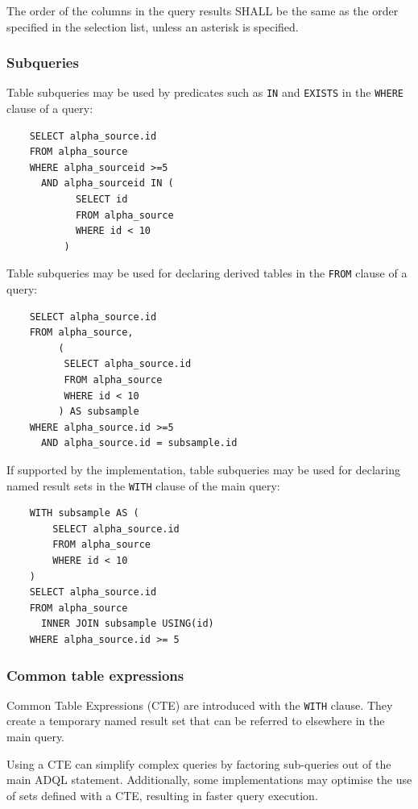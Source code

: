 \documentclass[11pt,a4paper]{ivoa}
\begin{document}
The order of the columns in the query results SHALL be the same as the
order specified in the selection list,
unless an asterisk is specified.

\subsubsection{Subqueries}
\label{sec:subqueries}

Table subqueries may be used by predicates such as \verb:IN: and \verb:EXISTS:
in the \verb:WHERE: clause of a query:

\begin{verbatim}
    SELECT alpha_source.id
    FROM alpha_source
    WHERE alpha_sourceid >=5
      AND alpha_sourceid IN (
            SELECT id
            FROM alpha_source
            WHERE id < 10
          )
\end{verbatim}

Table subqueries may be used for declaring derived tables in the \verb:FROM: clause
of a query:

\begin{verbatim}
    SELECT alpha_source.id
    FROM alpha_source,
         (
          SELECT alpha_source.id
          FROM alpha_source
          WHERE id < 10
         ) AS subsample
    WHERE alpha_source.id >=5
      AND alpha_source.id = subsample.id
\end{verbatim}

If supported by the implementation, table subqueries may be used for declaring
named result sets in the \verb:WITH: clause of the main query:

\begin{verbatim}
    WITH subsample AS (
        SELECT alpha_source.id
        FROM alpha_source
        WHERE id < 10
    )
    SELECT alpha_source.id
    FROM alpha_source
      INNER JOIN subsample USING(id)
    WHERE alpha_source.id >= 5
\end{verbatim}

\subsubsection{Common table expressions}
\label{sec:common-table}

Common Table Expressions (CTE) are introduced with the \texttt{WITH} clause.
They create a temporary named result set that can be referred to elsewhere in
the main query.

Using a CTE can simplify complex queries by factoring sub-queries out of the
main ADQL statement. Additionally, some implementations may optimise the use of
sets defined with a CTE, resulting in faster query execution.
\end{document}
